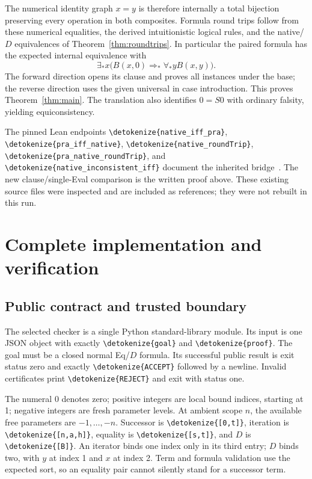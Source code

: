 \documentclass[11pt]{article}
\theoremstyle{definition}
\newcommand{\file}[1]{\expandafter\nolinkurl\expandafter{\detokenize{#1}}}
\begin{document}
The numerical identity graph $x=y$ is therefore internally a total
bijection preserving every operation in both composites. Formula round
trips follow from these numerical equalities, the derived intuitionistic
logical rules, and the native/$D$ equivalences of
Theorem~\ref{thm:roundtrips}. In particular the paired formula has the
expected internal equivalence with
\[
\exists_*x\bigl(B(x,0)\Rightarrow_*\forall_*yB(x,y)\bigr).
\]
The forward direction opens its clause and proves all instances under the
base; the reverse direction uses the given universal in case introduction.
This proves Theorem~\ref{thm:main}. The translation also identifies
$0=S0$ with ordinary falsity, yielding equiconsistency.

The pinned Lean endpoints \file{native_iff_pra},
\file{pra_iff_native}, \file{native_roundTrip},
\file{pra_native_roundTrip}, and \file{native_inconsistent_iff}
document the inherited bridge~\cite{bridge}. The new clause/single-Eval
comparison is the written proof above. These existing source files were
inspected and are included as references; they were not rebuilt in this run.

\section{Complete implementation and verification}

\subsection{Public contract and trusted boundary}

The selected checker is a single Python standard-library module. Its input
is one JSON object with exactly \file{goal} and \file{proof}. The goal
must be a closed normal Eq/$D$ formula. Its successful public result is
exit status zero and exactly \file{ACCEPT} followed by a newline. Invalid
certificates print \file{REJECT} and exit with status one.

The numeral $0$ denotes zero; positive integers are local bound indices,
starting at 1; negative integers are fresh parameter levels. At ambient
scope $n$, the available free parameters are $-1,\ldots,-n$. Successor
is \file{[0,t]}, iteration is \file{[n,a,h]}, equality is
\file{[s,t]}, and $D$ is \file{[B]}. An iterator binds one index only
in its third entry; $D$ binds two, with $y$ at index 1 and $x$ at index 2.
Term and formula validation use the expected sort, so an equality pair
cannot silently stand for a successor term.
\end{document}
